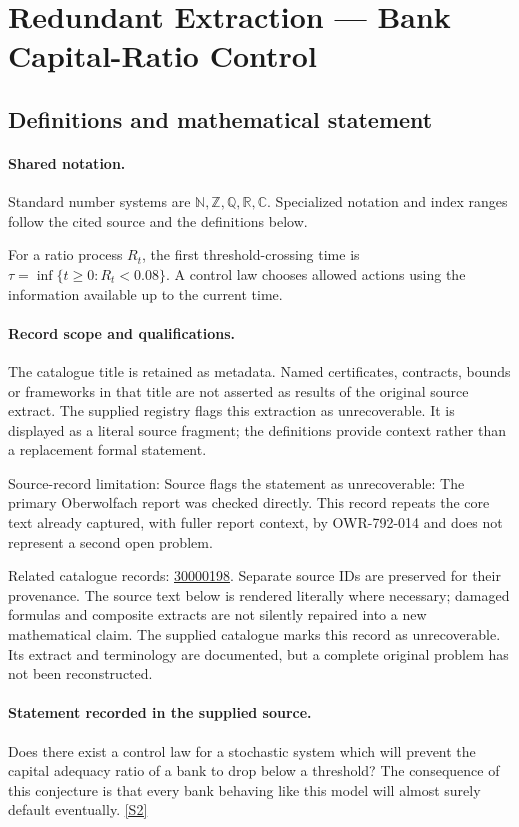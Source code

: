 \documentclass[11pt]{article}
\newcommand{\sref}[2]{\hyperlink{source:#1:#2}{[S#2]}}
\begin{document}
\section{Redundant Extraction — Bank Capital-Ratio Control}\label{statement}

\subsection{Definitions and mathematical statement}

\paragraph{Shared notation.}Standard number systems are $\mathbb N,\mathbb Z,\mathbb Q,\mathbb R,\mathbb C$. Specialized notation and index ranges follow the cited source and the definitions below.


For a ratio process $R_t$, the first threshold-crossing time is $\tau=\inf\{t\geq0:R_t<0.08\}$. A control law chooses allowed actions using the information available up to the current time.
\paragraph{Record scope and qualifications.}
The catalogue title is retained as metadata. Named certificates, contracts, bounds or frameworks in that title are not asserted as results of the original source extract.
The supplied registry flags this extraction as unrecoverable. It is displayed as a literal source fragment; the definitions provide context rather than a replacement formal statement.

Source-record limitation: Source flags the statement as unrecoverable: The primary Oberwolfach report was checked directly. This record repeats the core text already captured, with fuller report context, by OWR-792-014 and does not represent a second open problem.

Related catalogue records: \href{https://mehmetmars7.github.io/Erdosproblems-llm-hunter/problem.html?type=open_problems&id=30000198}{30000198}. Separate source IDs are preserved for their provenance.
The source text below is rendered literally where necessary; damaged formulas and composite extracts are not silently repaired into a new mathematical claim.
The supplied catalogue marks this record as unrecoverable. Its extract and terminology are documented, but a complete original problem has not been reconstructed.
\paragraph{Statement recorded in the supplied source.}
Does there exist a control law for a stochastic system which will prevent the capital adequacy ratio of a bank to drop below a threshold? The consequence of this conjecture is that every bank behaving like this model will almost surely default eventually. \sref{statement}{2}
\end{document}
